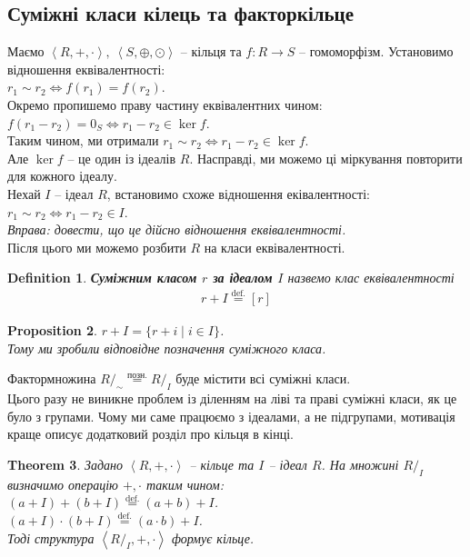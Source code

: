 \documentclass[a4paper, 10pt]{article}
\theoremstyle{theoremdd}
\newtheorem{theorem}{Theorem}[subsection]
\theoremstyle{theoremdd}
\newtheorem{definition}[theorem]{Definition}
\theoremstyle{theoremdd}
\theoremstyle{theoremdd}
\theoremstyle{theoremdd}
\theoremstyle{theoremdd}
\theoremstyle{theoremdd}
\theoremstyle{theoremdd}
\theoremstyle{theoremdd}
\newtheorem{proposition}[theorem]{Proposition}
\theoremstyle{theoremdd}
\theoremstyle{theoremdd}
\theoremstyle{theoremdd}
\theoremstyle{theoremdd}
\theoremstyle{theoremdd}
\theoremstyle{theoremdd}
\newcommand{\eqbydef}{\overset{\text{def.}}{=}}
\begin{document}
\subsection{Суміжні класи кілець та факторкільце}
Маємо $\left< R, +, \cdot \right>,\ \left< S, \oplus, \odot \right>$ -- кільця та $f \colon R \to S$ -- гомоморфізм. Установимо відношення еквівалентності:\\
$r_1 \sim r_2 \iff f(r_1) = f(r_2)$.\\
Окремо пропишемо праву частину еквівалентних чином:\\
$f(r_1-r_2) = 0_S \iff r_1 - r_2 \in \ker f$.\\
Таким чином, ми отримали $r_1 \sim r_2 \iff r_1 - r_2 \in \ker f$.\\
Але $\ker f$ -- це один із ідеалів $R$. Насправді, ми можемо ці міркування повторити для кожного ідеалу.
\bigskip \\
Нехай $I$ -- ідеал $R$, встановимо схоже відношення еківалентності:\\
$r_1 \sim r_2 \iff r_1 - r_2 \in I$.\\
\textit{Вправа: довести, що це дійсно відношення еквівалентності.}\\
Після цього ми можемо розбити $R$ на класи еквівалентності.

\begin{definition}
\textbf{Суміжним класом $r$ за ідеалом $I$} назвемо клас еквівалентності
\begin{align*}
r+I \eqbydef [r]
\end{align*}
\end{definition}

\begin{proposition}
$r+I = \{ r+i \mid i \in I \}$.\\
\textit{Тому ми зробили відповідне позначення суміжного класа.}
\end{proposition}
Фактормножина $R/_\sim \overset{\text{позн.}}{=} R/_I$ буде містити всі суміжні класи.
\bigskip \\
Цього разу не виникне проблем із діленням на ліві та праві суміжні класи, як це було з групами. Чому ми саме працюємо з ідеалами, а не підгрупами, мотивація краще описує додатковий розділ про кільця в кінці.

\begin{theorem}
Задано $\left< R,+,\cdot \right>$ -- кільце та $I$ -- ідеал $R$. На множині $R/_I$ визначимо операцію $+, \cdot$ таким чином:\\
$(a+I) + (b+I) \eqbydef (a+b)+I$.\\
$(a+I) \cdot (b+I) \eqbydef (a \cdot b) + I$.\\
Тоді структура $\left< R/_I, +, \cdot \right>$ формує кільце.
\end{theorem}
\end{document}
